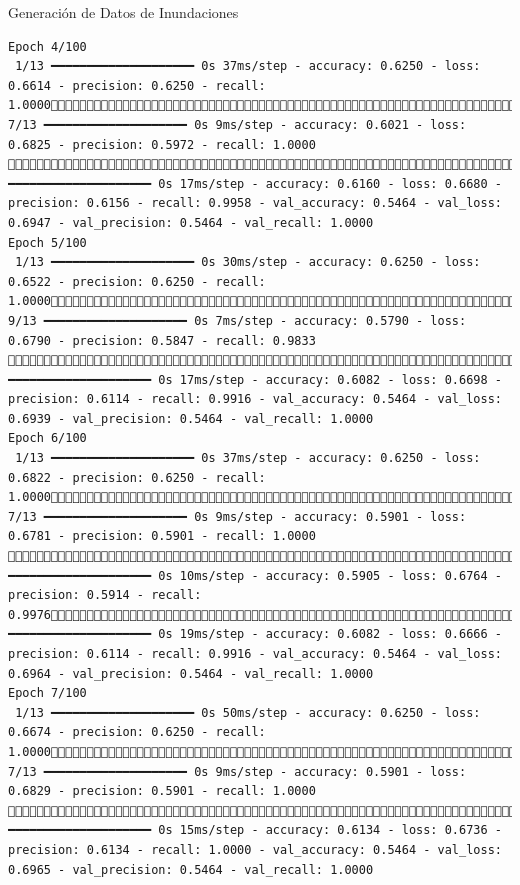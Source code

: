 \documentclass[
  ignorenonframetext,
]{beamer}
\begin{document}
\begin{frame}[fragile]{Generación de Datos de Inundaciones}
\begin{verbatim}
Epoch 4/100
 1/13 ━━━━━━━━━━━━━━━━━━━━ 0s 37ms/step - accuracy: 0.6250 - loss: 0.6614 - precision: 0.6250 - recall: 1.0000 7/13 ━━━━━━━━━━━━━━━━━━━━ 0s 9ms/step - accuracy: 0.6021 - loss: 0.6825 - precision: 0.5972 - recall: 1.0000 13/13 ━━━━━━━━━━━━━━━━━━━━ 0s 17ms/step - accuracy: 0.6160 - loss: 0.6680 - precision: 0.6156 - recall: 0.9958 - val_accuracy: 0.5464 - val_loss: 0.6947 - val_precision: 0.5464 - val_recall: 1.0000
Epoch 5/100
 1/13 ━━━━━━━━━━━━━━━━━━━━ 0s 30ms/step - accuracy: 0.6250 - loss: 0.6522 - precision: 0.6250 - recall: 1.0000 9/13 ━━━━━━━━━━━━━━━━━━━━ 0s 7ms/step - accuracy: 0.5790 - loss: 0.6790 - precision: 0.5847 - recall: 0.9833 13/13 ━━━━━━━━━━━━━━━━━━━━ 0s 17ms/step - accuracy: 0.6082 - loss: 0.6698 - precision: 0.6114 - recall: 0.9916 - val_accuracy: 0.5464 - val_loss: 0.6939 - val_precision: 0.5464 - val_recall: 1.0000
Epoch 6/100
 1/13 ━━━━━━━━━━━━━━━━━━━━ 0s 37ms/step - accuracy: 0.6250 - loss: 0.6822 - precision: 0.6250 - recall: 1.0000 7/13 ━━━━━━━━━━━━━━━━━━━━ 0s 9ms/step - accuracy: 0.5901 - loss: 0.6781 - precision: 0.5901 - recall: 1.0000 12/13 ━━━━━━━━━━━━━━━━━━━━ 0s 10ms/step - accuracy: 0.5905 - loss: 0.6764 - precision: 0.5914 - recall: 0.997613/13 ━━━━━━━━━━━━━━━━━━━━ 0s 19ms/step - accuracy: 0.6082 - loss: 0.6666 - precision: 0.6114 - recall: 0.9916 - val_accuracy: 0.5464 - val_loss: 0.6964 - val_precision: 0.5464 - val_recall: 1.0000
Epoch 7/100
 1/13 ━━━━━━━━━━━━━━━━━━━━ 0s 50ms/step - accuracy: 0.6250 - loss: 0.6674 - precision: 0.6250 - recall: 1.0000 7/13 ━━━━━━━━━━━━━━━━━━━━ 0s 9ms/step - accuracy: 0.5901 - loss: 0.6829 - precision: 0.5901 - recall: 1.0000 13/13 ━━━━━━━━━━━━━━━━━━━━ 0s 15ms/step - accuracy: 0.6134 - loss: 0.6736 - precision: 0.6134 - recall: 1.0000 - val_accuracy: 0.5464 - val_loss: 0.6965 - val_precision: 0.5464 - val_recall: 1.0000

\end{verbatim}
\end{frame}
\end{document}
